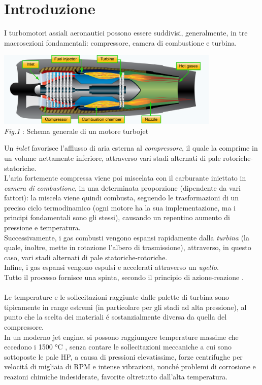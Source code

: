 \documentclass{article}
\begin{document}
    \section{Introduzione\label{Intro}}
    I turbomotori assiali aeronautici possono essere suddivisi, generalmente, in tre macrosezioni
    fondamentali: compressore, camera di combustione e turbina.\\
    \begin{center}
        \includegraphics[width=0.8\textwidth]{Sources/turbojet.png}\\
        \textit{Fig.1 }: Schema generale di un motore turbojet \autocite*{turbojet} 
         \label{fig:turbojet_general}
    \end{center}
    Un \textit{inlet} favorisce l'afflusso di aria esterna al \textit{compressore}, il quale
    la comprime in un volume nettamente inferiore, attraverso vari stadi alternati di pale rotoriche-statoriche.\\
    L'aria fortemente compressa viene poi miscelata con il carburante iniettato in \textit{camera di combustione},
    in una determinata proporzione (dipendente da vari fattori): la miscela viene quindi combusta, seguendo le trasformazioni di
    un preciso ciclo termodinamico (ogni motore ha la sua implementazione, ma i principi fondamentali sono gli stessi), causando un repentino
    aumento di pressione e temperatura.\\
    Successivamente, i gas combusti vengono espansi rapidamente dalla \textit{turbina} (la quale, inoltre, mette in rotazione l'albero di trasmissione), attraverso, in questo caso,
    vari stadi alternati di pale statoriche-rotoriche.\\
    Infine, i gas espansi vengono espulsi e accelerati attraverso un \textit{ugello}.\\
    Tutto il processo fornisce una spinta, secondo il principio di azione-reazione \autocite*{Aircr_engine_design}.\\ \\
    Le temperature e le sollecitazioni raggiunte dalle palette di turbina sono tipicamente in range estremi (in particolare per gli stadi ad alta pressione),
    al punto che la scelta dei materiali é sostanzialmente diversa da quella del compressore.\\
    In un moderno jet engine, si possono raggiungere temperature massime che eccedono i 1500 °C \autocite*{SciencePubGroup}, 
    senza contare le sollecitazioni meccaniche a cui sono sottoposte le pale HP, a causa di pressioni elevatissime,
    forze centrifughe per velocitá di migliaia di RPM e intense vibrazioni, nonché problemi di corrosione
    e reazioni chimiche indesiderate, favorite oltretutto dall'alta temperatura.\\
    
\end{document}
